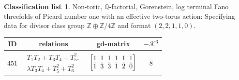 \documentclass[10pt,a4paper]{amsart}
\theoremstyle{definition}
\newtheorem{class-list}[thm]{Classification list}
\def\ZZ{{\mathbb Z}}
\def\QQ{{\mathbb Q}}
\numberwithin{equation}{section}
\begin{document}
\begin{class-list}
Non-toric, $\QQ$-factorial, Gorenstein, log terminal Fano
threefolds of Picard number one with an effective two-torus action:
Specifying data for divisor class group $\ZZ\oplus \ZZ/4\ZZ$ and
format $(2,2,1,1,0)$.
\begin{table}[h!]\centering\setlength{\tabcolsep}{5.5pt}
\renewcommand{\arraystretch}{1.35}\small\tabulinesep=1mm
\begin{tabu}{c|c|c|c}
\hline
ID&relations&gd-matrix&$-\mathcal{K}^3$
\\
\hline
${451}$&$\begin{array}{r}{T_{1}T_{2}+T_{3}T_{4}+T_{5}^{2}},\\ {\lambda T_{3}T_{4}+T_{5}^{2}+T_{6}^{2}}\end{array}$
&$\arraycolsep=1mm\begin{bmatrix}{1} & {1} & {1} & {1} & {1} & {1} \\ {\bar{1}} & {\bar{3}} & {\bar{3}} & {\bar{1}} & {\bar{2}} & {\bar{0}}\end{bmatrix}$&${8}$
\\
\hline
\end{tabu}\vspace{4mm}
\end{table}
\end{class-list}

\newpage
\end{document}
